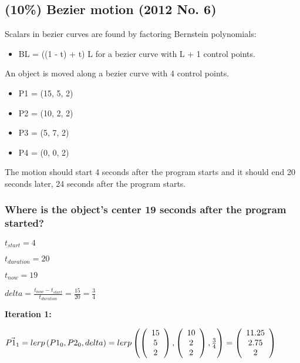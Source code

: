 \subsection{(10\%) Bezier motion (2012 No. 6)}
Scalars in bezier curves are found by factoring Bernstein polynomials:
\begin{itemize}
    \item BL = ((1 - t) + t) L for a bezier curve with L + 1 control points.
\end{itemize}

An object is moved along a bezier curve with 4 control points.
\begin{itemize}
    \item P1 = (15, 5, 2)
    \item P2 = (10, 2, 2)
    \item P3 = (5, 7, 2)
    \item P4 = (0, 0, 2)
\end{itemize}

The motion should start 4 seconds after the program starts and it should end 20 seconds later, 24 seconds after the program starts.

\subsubsection{Where is the object's center 19 seconds after the program started?}


$ t_{start} = 4$

$ t_{duration} = 20$

$ t_{now} = 19$

$ delta = \frac{t_{now} - t_{start}}{t_{duration}} = \frac{15}{20} = \frac{3}{4} $

\newpage

\textbf{Iteration 1:}

$ 
    \vec{P1_1} 
= 
    lerp\left(P1_0, P2_0, delta\right)
=
    lerp\left(
        \left(\begin{array}{c} 15\\5\\2 \end{array}\right), 
        \left(\begin{array}{c} 10\\2\\2 \end{array}\right),
        \frac{3}{4} 
    \right)
=
    \left(\begin{array}{c} 11.25\\2.75\\2 \end{array}\right)
$

